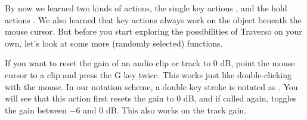 By now we learned two kinds of actions, the single key actions , and the hold actions . We also learned that key actions always work on the object beneath the mouse cursor. But before you start exploring the possibilities of Traverso on your own, let's look at some more (randomly selected) functions.

If you want to reset the gain of an audio clip or track to 0 dB, point the mouse cursor to a clip and press the G key twice. This works just like double-clicking with the mouse. In our notation scheme, a double key stroke is notated as . You will see that this action first resets the gain to 0 dB, and if called again, toggles the gain between $-6$ and 0 dB. This also works on the track gain.

